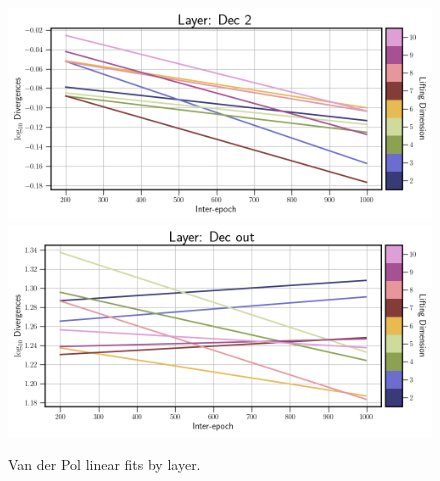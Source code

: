 \begin{figure}[!htbp]
\begin{minipage}{.5\textwidth}
        \includegraphics[width=\textwidth]{"../Figures/van_der_pol_div_plot_linear_dec_2.png"} 
        \includegraphics[width=\textwidth]{"../Figures/van_der_pol_div_plot_linear_dec_out.png"} 
    \end{minipage}
    \caption{Van der Pol linear fits by layer.}
    \label{fig:van der pol linear fits all layers}
\end{figure}


